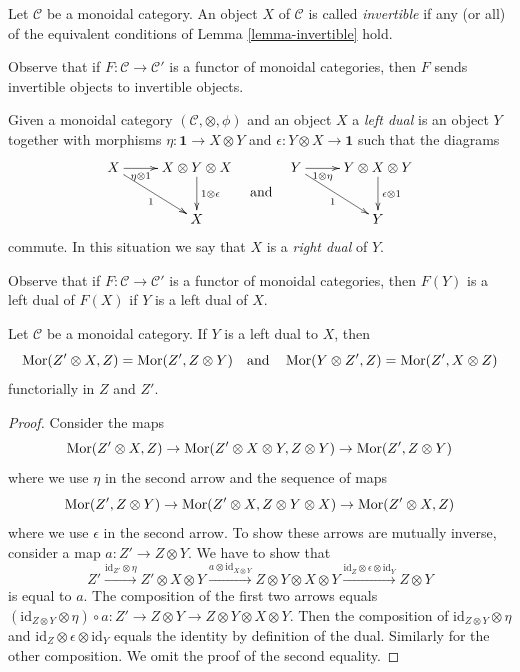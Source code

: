 \begin{definition}
\label{definition-invertible}
Let $\mathcal{C}$ be a monoidal category. An object $X$ of $\mathcal{C}$
is called {\it invertible} if any (or all) of the equivalent conditions of
Lemma \ref{lemma-invertible} hold.
\end{definition}

\noindent
Observe that if $F : \mathcal{C} \to \mathcal{C}'$ is a functor of
monoidal categories, then $F$ sends invertible objects to invertible
objects.

\begin{definition}
\label{definition-dual}
Given a monoidal category $(\mathcal{C}, \otimes, \phi)$
and an object $X$ a {\it left dual} is an object $Y$ together with
morphisms $\eta : \mathbf{1} \to X \otimes Y$ and
$\epsilon : Y \otimes X \to \mathbf{1}$
such that the diagrams
$$
\vcenter{
\xymatrix{
X \ar[rd]_1 \ar[r]_-{\eta \otimes 1} &
X \otimes Y \otimes X \ar[d]^{1 \otimes \epsilon} \\
& X
}
}
\quad\text{and}\quad
\vcenter{
\xymatrix{
Y \ar[rd]_1 \ar[r]_-{1 \otimes \eta} &
Y \otimes X \otimes Y \ar[d]^{\epsilon \otimes 1} \\
& Y
}
}
$$
commute. In this situation we say that $X$ is a {\it right dual} of $Y$.
\end{definition}

\noindent
Observe that if $F : \mathcal{C} \to \mathcal{C}'$ is a functor of
monoidal categories, then $F(Y)$ is a left dual of $F(X)$ if
$Y$ is a left dual of $X$.

\begin{lemma}
\label{lemma-left-dual}
Let $\mathcal{C}$ be a monoidal category. If $Y$ is a left dual to $X$,
then
$$
\mathop{\mathrm{Mor}}\nolimits(Z' \otimes X, Z) = \mathop{\mathrm{Mor}}\nolimits(Z', Z \otimes Y)
\quad\text{and}\quad
\mathop{\mathrm{Mor}}\nolimits(Y \otimes Z', Z) = \mathop{\mathrm{Mor}}\nolimits(Z', X \otimes Z)
$$
functorially in $Z$ and $Z'$.
\end{lemma}

\begin{proof}
Consider the maps
$$
\mathop{\mathrm{Mor}}\nolimits(Z' \otimes X, Z) \to
\mathop{\mathrm{Mor}}\nolimits(Z' \otimes X \otimes Y, Z \otimes Y) \to
\mathop{\mathrm{Mor}}\nolimits(Z', Z \otimes Y)
$$
where we use $\eta$ in the second arrow
and the sequence of maps
$$
\mathop{\mathrm{Mor}}\nolimits(Z', Z \otimes Y) \to
\mathop{\mathrm{Mor}}\nolimits(Z' \otimes X, Z \otimes Y \otimes X) \to
\mathop{\mathrm{Mor}}\nolimits(Z' \otimes X, Z)
$$
where we use $\epsilon$ in the second arrow.
To show these arrows are mutually inverse, consider a map
$a : Z' \to Z \otimes Y$. We have to show that
$$
Z' \xrightarrow{\text{id}_{Z'} \otimes \eta}
Z' \otimes X \otimes Y \xrightarrow{a \otimes \text{id}_{X \otimes Y}}
Z \otimes Y \otimes X \otimes Y
\xrightarrow{\text{id}_Z \otimes \epsilon \otimes \text{id}_Y}
Z \otimes Y
$$
is equal to $a$. The composition of the first two arrows equals
$(\text{id}_{Z \otimes Y} \otimes \eta) \circ a :
Z' \to Z \otimes Y \to Z \otimes Y \otimes X \otimes Y$.
Then the composition of $\text{id}_{Z \otimes Y} \otimes \eta$
and $\text{id}_Z \otimes \epsilon \otimes \text{id}_Y$ equals
the identity by definition of the dual. Similarly for the other
composition. We omit the proof of the second equality.
\end{proof}

